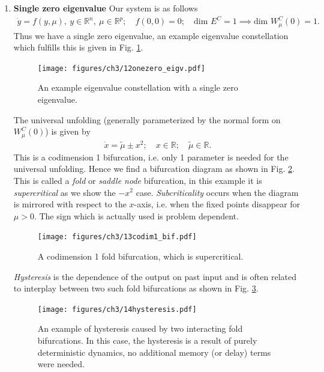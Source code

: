 \begin{enumerate}
	\item \textbf{Single zero eigenvalue} Our system is as follows
		\begin{align}
			\dot{y} = f(y, \mu),\ y \in \mathbb{R}^{n},\ \mu\in \mathbb{R}^{p};\quad f(0,0)=0;\quad  \textrm{dim }E^{C}=1\implies  \textrm{dim } W^{C}_{\mu }(0)=1.  
		\end{align}
		Thus we have a single zero eigenvalue, an example eigenvalue constellation which fulfills this is given in Fig. \ref{fig:1zero_eigv}.
		\begin{figure}[h!]
			\centering
			\texttt{[image: figures/ch3/12onezero\_eigv.pdf]}
			\caption{An example eigenvalue constellation with a single zero eigenvalue.}
			\label{fig:1zero_eigv}
		\end{figure}
		The universal unfolding (generally parameterized by the normal form on $W^{C}_{\mu }(0)$) is given by
		\begin{align}
			\boxed{
				\dot{x} = \tilde{\mu }\pm x^2;\quad x \in \mathbb{R};\quad \tilde{\mu } \in\mathbb{R}.
			}
		\end{align}
		This is a codimension 1 bifurcation, i.e. only 1 parameter is needed for the universal unfolding. Hence we find a bifurcation diagram as shown in Fig. \ref{fig:codim1_bif}. This is called a \emph{fold} or \emph{saddle node} bifurcation, in this example it is \emph{supercritical} as we show the $-x^2$ case. \emph{Subcriticality} occurs when the diagram is mirrored with respect to the $x$-axis, i.e. when the fixed points disappear for $\mu > 0$. The sign which is actually used is problem dependent.
		\begin{figure}[h!]
			\centering
			\texttt{[image: figures/ch3/13codim1\_bif.pdf]}
			\caption{A codimension 1 fold bifurcation, which is supercritical.}
			\label{fig:codim1_bif}
		\end{figure}
		\begin{remark}[]
			\emph{Hysteresis} is the dependence of the output on past input and is often related to interplay between two such fold bifurcations as shown in Fig. \ref{fig:hysteresis}.
		\begin{figure}[h!]
			\centering
			\texttt{[image: figures/ch3/14hysteresis.pdf]}
			\caption{An example of hysteresis caused by two interacting fold bifurcations. In this case, the hysteresis is a result of purely deterministic dynamics, no additional memory (or delay) terms were needed.}
			\label{fig:hysteresis}
		\end{figure}
		

\end{remark}
\end{enumerate}

